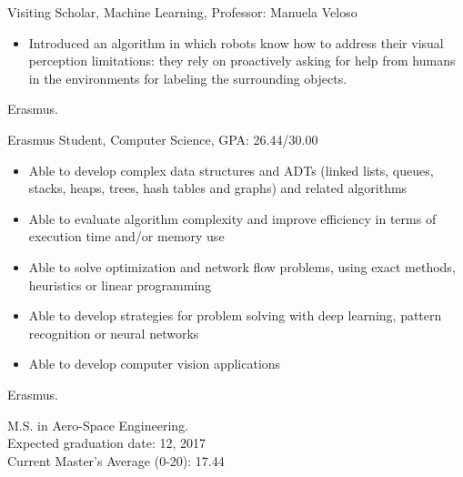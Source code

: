 \documentclass{article}
\begin{document}


\begin{llist}



 
{
Visiting Scholar, Machine Learning, Professor: Manuela Veloso
\begin{itemize}
\item[\textendash] Introduced an algorithm in which robots know how to address their visual perception limitations: they rely on proactively asking for help from humans in the environments for labeling the surrounding objects.
\end{itemize}
}
{
Erasmus.
}

 
{
Erasmus Student, Computer Science, GPA: 26.44/30.00
\begin{itemize}
\item[\textendash] Able to develop complex data structures and ADTs (linked lists, queues, stacks, heaps, trees, hash tables and graphs) and related algorithms
\item[\textendash] Able to evaluate algorithm complexity and improve efficiency in terms of execution time and/or memory use
\item[\textendash] Able to solve optimization and network flow problems, using exact methods, heuristics or linear programming
\item[\textendash] Able to develop strategies for problem solving with deep learning, pattern recognition or neural networks
\item[\textendash] Able to develop computer vision applications
\end{itemize}
}
{
Erasmus.
}

 
{
M.S. in Aero-Space Engineering.\\
Expected graduation date: 12, 2017\\
Current Master's Average (0-20): 17.44

}
\end{llist}
\end{document}
